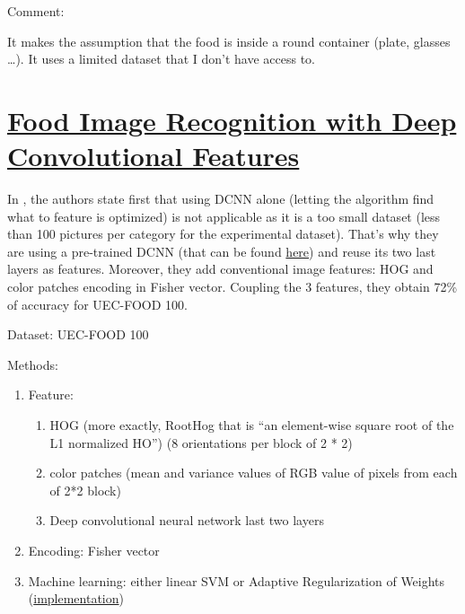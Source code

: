 Comment:

It makes the assumption that the food is inside a round container (plate, glasses …).
It uses a limited dataset that I don’t have access to.

\section{\href{http://dx.doi.org/10.1145/2638728.2641339}{Food Image Recognition with Deep Convolutional Features}}

In \cite{Kawano2014}, the authors state first that using DCNN alone (letting the algorithm find what to feature is optimized) is not applicable as it is a too small dataset (less than 100 pictures per category for the experimental dataset).
That’s why they are using a pre-trained DCNN (that can be found \href{http://cilvr.nyu.edu/doku.php?id=code:start}{here}) and reuse its two last layers as features. Moreover, they add conventional image features: HOG and color patches encoding in Fisher vector.
Coupling the 3 features, they obtain 72\% of accuracy for UEC-FOOD 100.

Dataset: UEC-FOOD 100

Methods:

\begin{enumerate}
    \item Feature:
    \begin{enumerate}
        \item HOG (more exactly, RootHog that is “an element-wise square root of the L1 normalized HO”) (8 orientations per block of 2 * 2)
        \item color patches (mean and variance values of  RGB value of pixels from each of 2*2  block)
        \item Deep convolutional neural network last two layers
    \end{enumerate}
    
    \item Encoding: Fisher vector
    
    \item Machine learning: either linear SVM or Adaptive Regularization of Weights (\href{https://github.com/tetsuok/arowpp}{implementation})
\end{enumerate}
